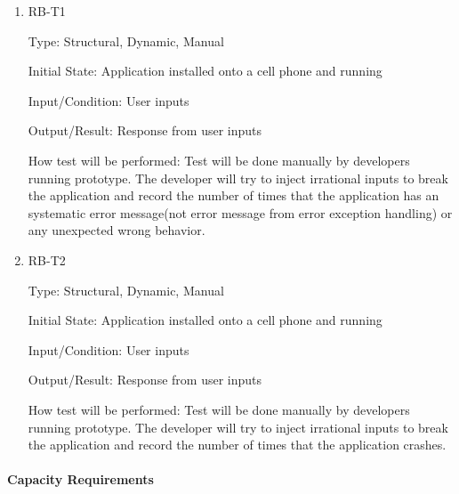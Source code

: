 \documentclass[12pt, titlepage]{article}
\begin{document}
\begin{enumerate}

\item{RB-T1\\}

Type: Structural, Dynamic, Manual
					
Initial State: Application installed onto a cell phone and running
					
Input/Condition: User inputs
					
Output/Result: Response from user inputs
					
How test will be performed: Test will be done manually by developers running prototype. The developer will try to inject irrational inputs to break the application and record the number of times that the application has an systematic error message(not error message from error exception handling) or any unexpected wrong behavior.
					
\item{RB-T2\\}

Type: Structural, Dynamic, Manual
					
Initial State: Application installed onto a cell phone and running
					
Input/Condition: User inputs
					
Output/Result: Response from user inputs
					
How test will be performed: Test will be done manually by developers running prototype. The developer will try to inject irrational inputs to break the application and record the number of times that the application crashes.

\end{enumerate}

\paragraph{Capacity Requirements}
\end{document}

